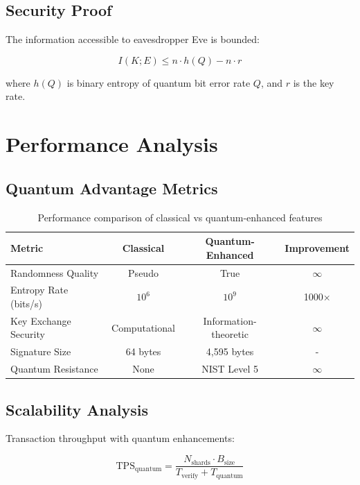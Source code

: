 \documentclass[11pt,a4paper]{article}
\begin{document}
\subsection{Security Proof}

The information accessible to eavesdropper Eve is bounded:

\begin{equation}
I(K;E) \leq n \cdot h(Q) - n \cdot r
\end{equation}

where $h(Q)$ is binary entropy of quantum bit error rate $Q$, and $r$ is the key rate.

\section{Performance Analysis}

\subsection{Quantum Advantage Metrics}

\begin{table}[H]
\centering
\begin{tabular}{|l|c|c|c|}
\hline
\textbf{Metric} & \textbf{Classical} & \textbf{Quantum-Enhanced} & \textbf{Improvement} \\
\hline
Randomness Quality & Pseudo & True & $\infty$ \\
Entropy Rate (bits/s) & $10^6$ & $10^9$ & 1000× \\
Key Exchange Security & Computational & Information-theoretic & $\infty$ \\
Signature Size & 64 bytes & 4,595 bytes & - \\
Quantum Resistance & None & NIST Level 5 & $\infty$ \\
\hline
\end{tabular}
\caption{Performance comparison of classical vs quantum-enhanced features}
\end{table}

\subsection{Scalability Analysis}

Transaction throughput with quantum enhancements:

\begin{equation}
\text{TPS}_{\text{quantum}} = \frac{N_{\text{shards}} \cdot B_{\text{size}}}{T_{\text{verify}} + T_{\text{quantum}}}
\end{equation}
\end{document}
